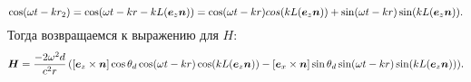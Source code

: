 \begin{equation*}
	\cos(\omega t - k r_2) = \cos (\omega t - k r - k L (\mbox{\boldmath $e$}_z \mbox{\boldmath $n$}))
	=
	\cos(\omega t - k r) cos (k L (\mbox{\boldmath $e$}_z \mbox{\boldmath $n$})) + \sin (\omega t - k r) \sin (k L (\mbox{\boldmath $e$}_z \mbox{\boldmath $n$})).
\end{equation*}
Тогда возвращаемся к выражению для $H$:
\begin{equation*}
	\mbox{\boldmath $H$} = \frac{-2 \omega^2 d}{c^2 r} \left([\mbox{\boldmath $e$}_z \times \mbox{\boldmath $n$}] \cos \theta_d \cos (\omega t - k r) \cos (k L (\mbox{\boldmath $e$}_z \mbox{\boldmath $n$})\right)
	-
	[\mbox{\boldmath $e$}_x \times \mbox{\boldmath $n$}] \sin \theta_d \sin (\omega t - k r) \sin (k L (\mbox{\boldmath $e$}_z \mbox{\boldmath $n$}))).
\end{equation*}

